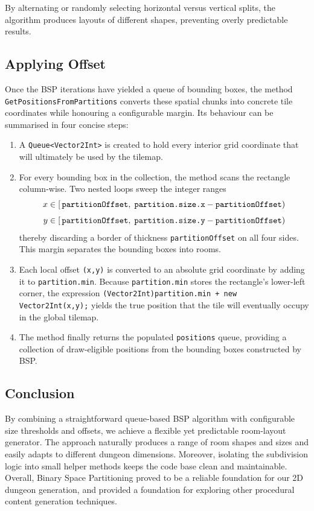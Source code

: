 \documentclass[a4paper, 12pt, one column, aas_macros]{article}
\begin{document}
By alternating or randomly selecting horizontal versus vertical splits, the algorithm produces layouts of different shapes, preventing overly predictable results.

\subsection{Applying Offset}
Once the BSP iterations have yielded a queue of bounding boxes, the method \\ \texttt{GetPositionsFromPartitions} converts these spatial chunks into concrete tile coordinates while honouring a configurable margin. Its behaviour can be summarised in four concise steps:
\begin{enumerate}
  \item A \texttt{Queue<Vector2Int>} is created to hold every interior grid coordinate that will ultimately be used by the tilemap.
  \item For every bounding box in the collection, the method scans the rectangle column-wise. Two nested loops sweep the integer ranges 
\[
\begin{aligned}
  x &\in [\,\text{\texttt{partitionOffset}},\;
           \text{\texttt{partition.size.x}}
           - \text{\texttt{partitionOffset}}) \\[4pt]
  y &\in [\,\text{\texttt{partitionOffset}},\;
           \text{\texttt{partition.size.y}}
           - \text{\texttt{partitionOffset}})
\end{aligned}
\]
thereby discarding a border of thickness \texttt{partitionOffset} on all four sides. This margin separates the bounding boxes into rooms.
  \item Each local offset \texttt{(x,y)} is converted to an absolute grid coordinate by adding it to \texttt{partition.min}. Because \texttt{partition.min} stores the rectangle's lower-left corner, the expression \texttt{(Vector2Int)partition.min + new Vector2Int(x,y);} yields the true position that the tile will eventually occupy in the global tilemap.
  \item The method finally returns the populated \texttt{positions} queue, providing a collection of draw-eligible positions from the bounding boxes constructed by BSP.
\end{enumerate}

\subsection{Conclusion}
By combining a straightforward queue-based BSP algorithm with configurable size thresholds and offsets, we achieve a flexible yet predictable room-layout generator. The approach naturally produces a range of room shapes and sizes and easily adapts to different dungeon dimensions. Moreover, isolating the subdivision logic into small helper methods keeps the code base clean and maintainable. Overall, Binary Space Partitioning proved to be a reliable foundation for our 2D dungeon generation, and provided a foundation for exploring other procedural content generation techniques.
\end{document}
